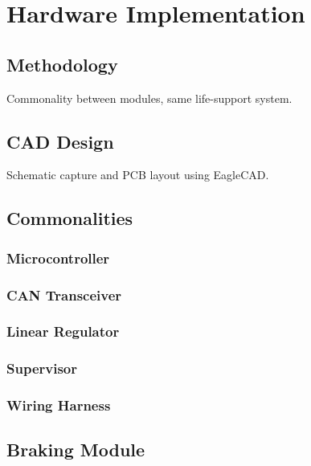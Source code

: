 \section{Hardware Implementation\label{sec:Hardware-Implementation}}


\subsection{Methodology}

Commonality between modules, same life-support system.


\subsection{CAD Design}

Schematic capture and PCB layout using EagleCAD.


\subsection{Commonalities }


\subsubsection{Microcontroller}


\subsubsection{CAN Transceiver}


\subsubsection{Linear Regulator}


\subsubsection{Supervisor}


\subsubsection{Wiring Harness}





\subsection{Braking Module}

